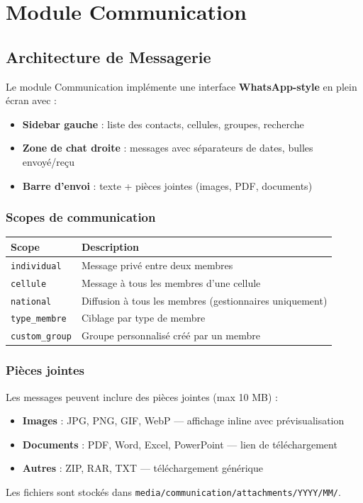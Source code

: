 \documentclass[12pt,a4paper]{article}
\begin{document}
\section{Module Communication}

\subsection{Architecture de Messagerie}

Le module Communication implémente une interface \textbf{WhatsApp-style} en plein écran avec :

\begin{itemize}
    \item \textbf{Sidebar gauche} : liste des contacts, cellules, groupes, recherche
    \item \textbf{Zone de chat droite} : messages avec séparateurs de dates, bulles envoyé/reçu
    \item \textbf{Barre d'envoi} : texte + pièces jointes (images, PDF, documents)
\end{itemize}

\subsubsection{Scopes de communication}

\begin{tabularx}{\textwidth}{lX}
\toprule
\textbf{Scope} & \textbf{Description} \\
\midrule
\texttt{individual} & Message privé entre deux membres \\
\texttt{cellule} & Message à tous les membres d'une cellule \\
\texttt{national} & Diffusion à tous les membres (gestionnaires uniquement) \\
\texttt{type\_membre} & Ciblage par type de membre \\
\texttt{custom\_group} & Groupe personnalisé créé par un membre \\
\bottomrule
\end{tabularx}

\subsubsection{Pièces jointes}

Les messages peuvent inclure des pièces jointes (max 10 MB) :
\begin{itemize}
    \item \textbf{Images} : JPG, PNG, GIF, WebP — affichage inline avec prévisualisation
    \item \textbf{Documents} : PDF, Word, Excel, PowerPoint — lien de téléchargement
    \item \textbf{Autres} : ZIP, RAR, TXT — téléchargement générique
\end{itemize}
Les fichiers sont stockés dans \texttt{media/communication/attachments/YYYY/MM/}.
\end{document}
